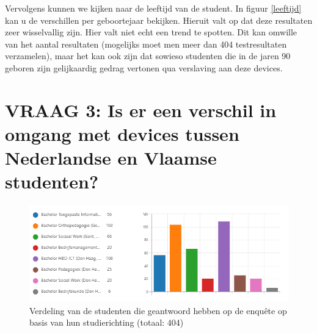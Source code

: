 \begin{table}[]
	\centering
	\caption{Correlatie tussen geboortejaar van teststudenten en hun dagelijks gebruik}
	\label{leeftijd}
\end{table}

Vervolgens kunnen we kijken naar de leeftijd van de student. In figuur \ref{leeftijd} kan u de verschillen per geboortejaar bekijken. Hieruit valt op dat deze resultaten zeer wisselvallig zijn. Hier valt niet echt een trend te spotten. Dit kan omwille van het aantal resultaten (mogelijks moet men meer dan 404 testresultaten verzamelen), maar het kan ook zijn dat sowieso studenten die in de jaren 90 geboren zijn gelijkaardig gedrag vertonen qua verslaving aan deze devices.

\section{VRAAG 3: Is er een verschil in omgang met devices tussen Nederlandse en Vlaamse studenten?}
\label{sec:vlaanderen-nederland}

\begin{figure}
	\includegraphics[width=\textwidth]
	{img/verdeling-enquete-richting.png}
	\caption{Verdeling van de studenten die geantwoord hebben op de enquête op basis van hun studierichting (totaal: 404)}
	\label{fig:verdeling-enquete-richting}
\end{figure}

